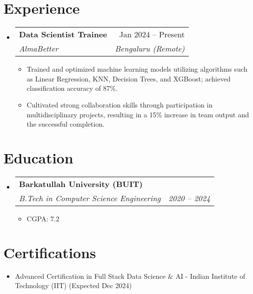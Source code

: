 \documentclass[letterpaper,10pt]{article}
\makeatletter
\newcommand{\resumeItem}[1]{\item\small{#1}}
\newcommand{\resumeSubheading}[4]{%
\vspace{-1pt}\item
  \begin{tabular*}{0.97\textwidth}[t]{l@{\extracolsep{\fill}}r}
    \textbf{#1} & #2 \\
    \textit{#3} & \textit{#4} \\
  \end{tabular*}\vspace{-7pt}
}
\newcommand{\resumeSubHeadingList}{\begin{itemize}[leftmargin=0.15in, label={}]}
\newcommand{\resumeSubHeadingListEnd}{\end{itemize}}
\makeatother
\begin{document}
\section{Experience}
\resumeSubHeadingList
  \resumeSubheading
      {Data Scientist Trainee}{Jan 2024 -- Present}
      {AlmaBetter}{Bengaluru (Remote)}
      \resumeSubHeadingList
          \resumeItem{\textbullet Trained and optimized machine learning models utilizing algorithms such as Linear Regression, KNN, Decision Trees, and XGBoost; achieved classification accuracy of 87\%.}
          \resumeItem{\textbullet Cultivated strong collaboration skills through participation in multidisciplinary projects, resulting in a 15\% increase in team output and the successful completion.}
      \resumeSubHeadingListEnd
\resumeSubHeadingListEnd

\section{Education}
\resumeSubHeadingList
  \resumeSubheading
      {Barkatullah University (BUIT)}{}
      {B.Tech in Computer Science Engineering}{2020 -- 2024}
      \resumeSubHeadingList
          \resumeItem{CGPA: 7.2}
      \resumeSubHeadingListEnd
\resumeSubHeadingListEnd

\section{Certifications}
\resumeSubHeadingList
  \resumeItem{\textbullet Advanced Certification in Full Stack Data Science \& AI - Indian Institute of Technology (IIT) (Expected Dec 2024)}
\resumeSubHeadingListEnd
\end{document}
